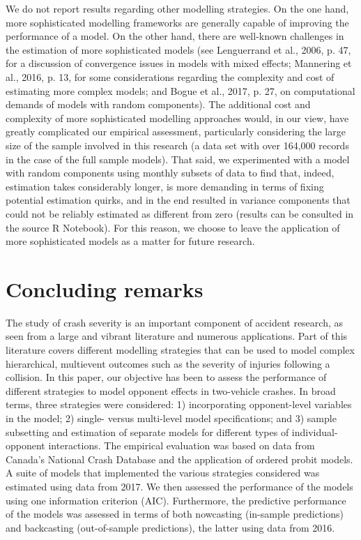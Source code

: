 \documentclass[]{elsarticle} %
\begin{document}
We do not report results regarding other modelling strategies. On the
one hand, more sophisticated modelling frameworks are generally capable
of improving the performance of a model. On the other hand, there are
well-known challenges in the estimation of more sophisticated models
(see Lenguerrand et al., 2006, p. 47, for a discussion of convergence
issues in models with mixed effects; Mannering et al., 2016, p. 13, for
some considerations regarding the complexity and cost of estimating more
complex models; and Bogue et al., 2017, p. 27, on computational demands
of models with random components). The additional cost and complexity of
more sophisticated modelling approaches would, in our view, have greatly
complicated our empirical assessment, particularly considering the large
size of the sample involved in this research (a data set with over
164,000 records in the case of the full sample models). That said, we
experimented with a model with random components using monthly subsets
of data to find that, indeed, estimation takes considerably longer, is
more demanding in terms of fixing potential estimation quirks, and in
the end resulted in variance components that could not be reliably
estimated as different from zero (results can be consulted in the source
R Notebook). For this reason, we choose to leave the application of more
sophisticated models as a matter for future research.

\hypertarget{sec:concluding-remarks}{%
\section{Concluding remarks}\label{sec:concluding-remarks}}

The study of crash severity is an important component of accident
research, as seen from a large and vibrant literature and numerous
applications. Part of this literature covers different modelling
strategies that can be used to model complex hierarchical, multievent
outcomes such as the severity of injuries following a collision. In this
paper, our objective has been to assess the performance of different
strategies to model opponent effects in two-vehicle crashes. In broad
terms, three strategies were considered: 1) incorporating opponent-level
variables in the model; 2) single- versus multi-level model
specifications; and 3) sample subsetting and estimation of separate
models for different types of individual-opponent interactions. The
empirical evaluation was based on data from Canada's National Crash
Database and the application of ordered probit models. A suite of models
that implemented the various strategies considered was estimated using
data from 2017. We then assessed the performance of the models using one
information criterion (AIC). Furthermore, the predictive performance of
the models was assessed in terms of both nowcasting (in-sample
predictions) and backcasting (out-of-sample predictions), the latter
using data from 2016.
\end{document}
